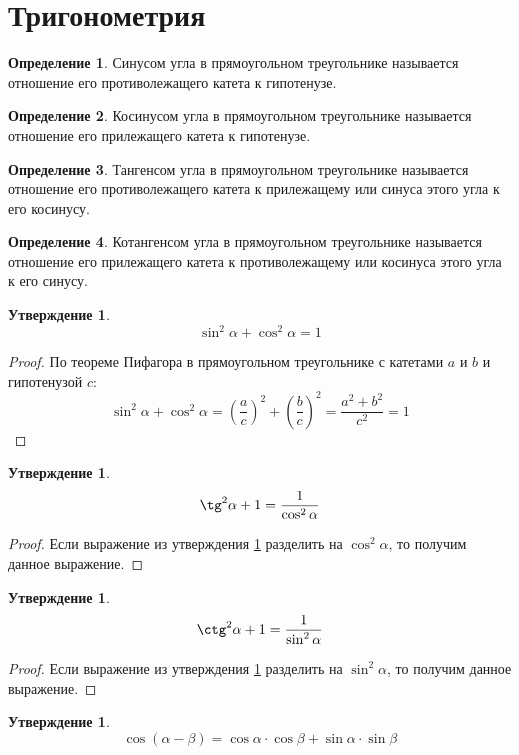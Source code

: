 \documentclass[12pt]{article}
\theoremstyle{definition}
\newtheorem{definition}{Определение}
\newtheorem{statement}[theorem]{Утверждение}
\begin{document}
\section{Тригонометрия}
\begin{definition}
    Синусом угла в прямоугольном треугольнике называется отношение его противолежащего катета к гипотенузе.
\end{definition}
\begin{definition}
    Косинусом угла в прямоугольном треугольнике называется отношение его прилежащего катета к гипотенузе.
\end{definition}
\begin{definition}
    Тангенсом угла в прямоугольном треугольнике называется отношение его противолежащего катета к прилежащему или синуса этого угла к его косинусу.
\end{definition}
\begin{definition}
    Котангенсом угла в прямоугольном треугольнике называется отношение его прилежащего катета к противолежащему или косинуса этого угла к его синусу.
\end{definition}
\begin{statement}\label{Основное тригонометрическое тождество}
    $$\sin^2 \alpha + \cos^2 \alpha=1$$
\end{statement}
\begin{proof}
    По теореме Пифагора в прямоугольном треугольнике с катетами $a$ и $b$ и гипотенузой $c$:
    $$\sin^2 \alpha + \cos^2 \alpha=\left(\dfrac{a}{c}\right)^2+\left(\dfrac{b}{c}\right)^2=\dfrac{a^2 + b^2}{c^2}=1$$
\end{proof}
\begin{statement}
    $$\tg^2\alpha + 1=\dfrac{1}{\cos^2 \alpha}$$
\end{statement}
\begin{proof}
    Если выражение из утверждения \ref{Основное тригонометрическое тождество} разделить на $\cos^2 \alpha$, то получим данное выражение.
\end{proof}
\begin{statement}
    $$\ctg^2\alpha + 1=\dfrac{1}{\sin^2 \alpha}$$
\end{statement}
\begin{proof}
    Если выражение из утверждения \ref{Основное тригонометрическое тождество} разделить на $\sin^2 \alpha$, то получим данное выражение.
\end{proof}
\begin{statement}
    $$\cos(\alpha - \beta)=\cos\alpha\cdot\cos\beta+\sin\alpha\cdot\sin\beta$$
\end{statement}
\end{document}
